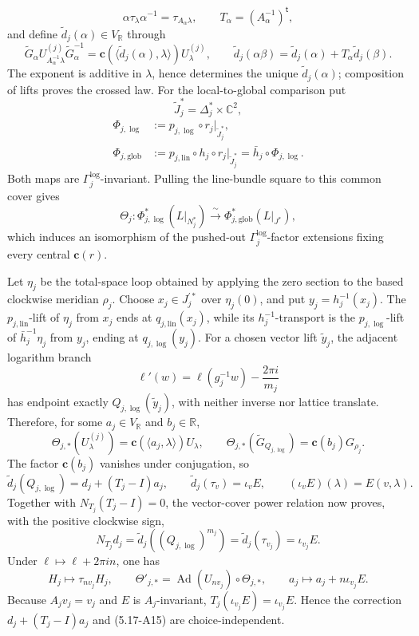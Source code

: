 \begin{itemize}[leftmargin=1.8em]
\[
 \alpha\tau_\lambda\alpha^{-1}=\tau_{A_\alpha\lambda},\qquad
 T_\alpha=(A_\alpha^{-1})^{\mathsf t},
\]
and define \(\widetilde d_j(\alpha)\in V_{\mathbb R}\) through
\[
 \widetilde G_\alpha
 U_{A_\alpha^{-1}\lambda}^{(j)}\widetilde G_\alpha^{-1}
 =\mathbf c\!\left(
 \langle\widetilde d_j(\alpha),\lambda\rangle\right)U_\lambda^{(j)},
\qquad
 \widetilde d_j(\alpha\beta)
 =\widetilde d_j(\alpha)+T_\alpha\widetilde d_j(\beta).
\]
The exponent is additive in \(\lambda\), hence determines the unique
\(\widetilde d_j(\alpha)\); composition of lifts proves the crossed law.
For the local-to-global comparison put
\[
 \widetilde J_j^*=\Delta_j^*\times\mathbb C^2,
\]
\[
\begin{aligned}
 \Phi_{j,\log}
  &:=p_{j,\log}\circ r_j|_{\widetilde J_j^*},\\
 \Phi_{j,\mathrm{glob}}
  &:=p_{j,\mathrm{lin}}\circ h_j\circ r_j|_{\widetilde J_j^*}
   =\bar h_j\circ\Phi_{j,\log}.
\end{aligned}
\]
Both maps are \(\Gamma_j^{\log}\)-invariant.  Pulling the line-bundle square
to this common cover gives
\[
 \Theta_j:
 \Phi_{j,\log}^*(L|_{N_j^*})
 \xrightarrow{\ \sim\ }
 \Phi_{j,\mathrm{glob}}^*(L|_{J^*}),
\]
which induces an isomorphism of the pushed-out
\(\Gamma_j^{\log}\)-factor extensions fixing every central
\(\mathbf c(r)\).

Let \(\eta_j\) be the total-space loop obtained by applying the zero section
to the based clockwise meridian \(\rho_j\).  Choose
\(x_j\in J_j^{\prime *}\) over \(\eta_j(0)\), and put
\(y_j=h_j^{-1}(x_j)\).  The \(p_{j,\mathrm{lin}}\)-lift of \(\eta_j\)
from \(x_j\) ends at
\(q_{j,\mathrm{lin}}(x_j)\), while its \(h_j^{-1}\)-transport is the
\(p_{j,\log}\)-lift of \(\bar h_j^{-1}\eta_j\) from \(y_j\), ending at
\(q_{j,\log}(y_j)\).
For a chosen vector lift \(\widetilde y_j\), the adjacent logarithm branch
\[
 \ell'(w)=\ell(g_j^{-1}w)-\frac{2\pi i}{m_j}
\]
has endpoint exactly \(Q_{j,\log}(\widetilde y_j)\), with neither inverse
nor lattice translate.  Therefore, for some \(a_j\in V_{\mathbb R}\) and
\(b_j\in\mathbb R\),
\[
 \Theta_{j,*}(U_\lambda^{(j)})
 =\mathbf c(\langle a_j,\lambda\rangle)U_\lambda,\qquad
 \Theta_{j,*}(\widetilde G_{Q_{j,\log}})
 =\mathbf c(b_j)G_{\rho_j}.
\]
The factor \(\mathbf c(b_j)\) vanishes under conjugation, so
\[
 \widetilde d_j(Q_{j,\log})=d_j+(T_j-I)a_j,\qquad
 \widetilde d_j(\tau_v)=\iota_vE,\qquad
 (\iota_vE)(\lambda)=E(v,\lambda).
\]
Together with \(N_{T_j}(T_j-I)=0\), the vector-cover power relation now
proves, with the positive clockwise sign,
\[
 N_{T_j}d_j
 =\widetilde d_j((Q_{j,\log})^{m_j})
 =\widetilde d_j(\tau_{v_j})=\iota_{v_j}E.
\]
Under \(\ell\mapsto\ell+2\pi in\), one has
\[
 H_j\longmapsto\tau_{nv_j}H_j,\qquad
 \Theta'_{j,*}=\operatorname{Ad}(U_{nv_j})\circ\Theta_{j,*},\qquad
 a_j\longmapsto a_j+n\iota_{v_j}E.
\]
Because \(A_jv_j=v_j\) and \(E\) is \(A_j\)-invariant,
\(T_j(\iota_{v_j}E)=\iota_{v_j}E\).  Hence the correction
\(d_j+(T_j-I)a_j\) and (5.17-A15) are choice-independent.


\end{itemize}
